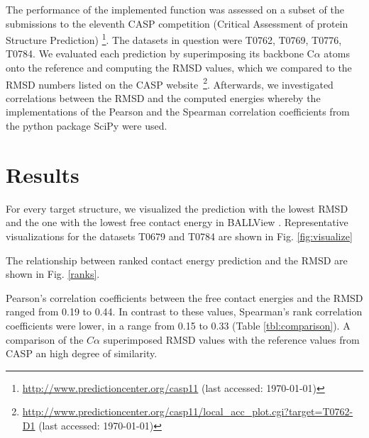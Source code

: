 \documentclass[11pt,a4paper]{article}
\newcommand{\fnurl}[2]{\footnote{\url{#1} (last accessed: #2)}} %
\begin{document}
The performance of the implemented function was assessed on a subset of the
submissions to the eleventh CASP competition (Critical Assessment of protein
Structure Prediction) \fnurl{http://www.predictioncenter.org/casp11}{\today}.
The datasets in question were T0762, T0769, T0776, T0784. We evaluated each
prediction by superimposing its backbone C$\alpha$ atoms onto the reference and
computing the RMSD values, which we compared to the RMSD numbers listed on the CASP
website~\fnurl{http://www.predictioncenter.org/casp11/local\_acc\_plot.cgi?target=T0762-D1}{\today}.
Afterwards, we investigated correlations between the RMSD and the computed
energies whereby the implementations of
the Pearson and the Spearman correlation coefficients from
the python package SciPy \citep{scipy} were used.

\section{Results}
For every target structure, we visualized the prediction with the lowest RMSD and
the one with the lowest free contact energy in BALLView \citep{ballview}.
Representative visualizations for the datasets T0679 and T0784 are shown in Fig. \ref{fig:visualize}


The relationship between ranked contact energy prediction and the RMSD are shown in Fig. \ref{ranks}.


Pearson's correlation coefficients between the free contact energies and the
RMSD
ranged from 0.19 to 0.44.
In contrast to these values,
Spearman's rank correlation coefficients were lower, in a range from 0.15 to 0.33 (Table \ref{tbl:comparison}).
A comparison of the $C\alpha$ superimposed RMSD values with the reference values
from
CASP an high degree of similarity.
\end{document}
